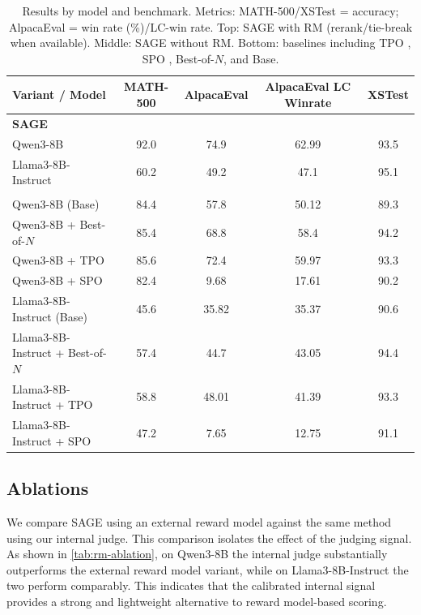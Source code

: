\documentclass[11pt]{article}
\theoremstyle{plain}
\theoremstyle{definition}
\theoremstyle{remark}
\newcommand{\method}{SAGE}
\begin{document}
\begin{table}[t]
\centering
\begin{small}
\begin{sc}
\begin{tabular}{lcccc}
\toprule
\textbf{Variant / Model} & \textbf{MATH-500} & \textbf{AlpacaEval} & \textbf{AlpacaEval LC Winrate} & \textbf{XSTest} \\
\midrule
\multicolumn{5}{l}{\textbf{\method{}}} \\
Qwen3-8B & 92.0 & 74.9 & 62.99 & 93.5 \\
Llama3-8B-Instruct & 60.2 & 49.2 & 47.1 & 95.1 \\
\addlinespace
\multicolumn{5}{l}{\textbf{Baselines}} \\
Qwen3-8B (Base) & 84.4 & 57.8 & 50.12 & 89.3 \\
Qwen3-8B + Best-of-\(N\) & 85.4 & 68.8 & 58.4 & 94.2 \\
Qwen3-8B + TPO & 85.6 & 72.4 & 59.97 & 93.3 \\
Qwen3-8B + SPO & 82.4 & 9.68 & 17.61 & 90.2 \\
Llama3-8B-Instruct (Base) & 45.6 & 35.82 & 35.37 & 90.6 \\
Llama3-8B-Instruct + Best-of-\(N\) & 57.4 & 44.7 & 43.05 & 94.4 \\
Llama3-8B-Instruct + TPO & 58.8 & 48.01 & 41.39 & 93.3 \\
Llama3-8B-Instruct + SPO & 47.2 & 7.65 & 12.75 & 91.1 \\
\bottomrule
\end{tabular}
\end{sc}
\end{small}
\caption{Results by model and benchmark. Metrics: MATH-500/XSTest = accuracy; AlpacaEval = win rate (\%)/LC-win rate. Top: \method{} with RM (rerank/tie-break when available). Middle: \method{} without RM. Bottom: baselines including TPO \citep{litest}, SPO \citep{xiang2025self}, Best-of-\(N\), and Base.}
\label{tab:results-by-model}
\end{table}

\subsection{Ablations}
\label{sec:ablations}
We compare \method{} using an external reward model against the same method using our internal judge. This comparison isolates the effect of the judging signal. As shown in \cref{tab:rm-ablation}, on Qwen3-8B the internal judge substantially outperforms the external reward model variant, while on Llama3-8B-Instruct the two perform comparably. This indicates that the calibrated internal signal provides a strong and lightweight alternative to reward model-based scoring.
\end{document}
